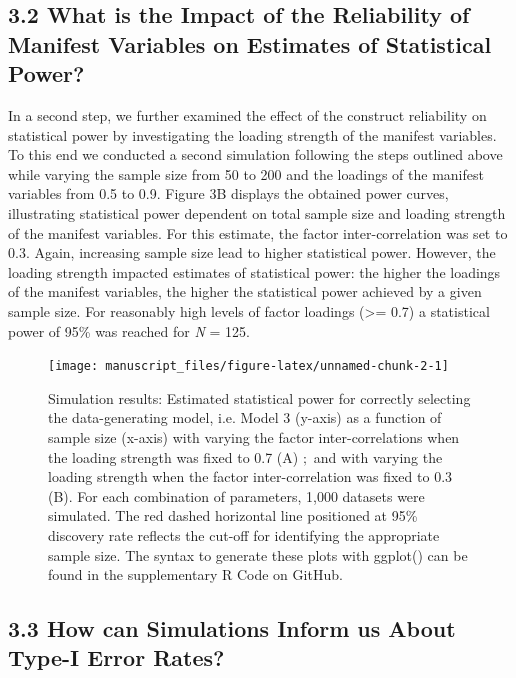 \documentclass[
  man,floatsintext]{apa6}
\begin{document}
\hypertarget{what-is-the-impact-of-the-reliability-of-manifest-variables-on-estimates-of-statistical-power}{%
\subsection{3.2 What is the Impact of the Reliability of Manifest Variables on Estimates of Statistical Power?}\label{what-is-the-impact-of-the-reliability-of-manifest-variables-on-estimates-of-statistical-power}}

In a second step, we further examined the effect of the construct reliability on statistical power by investigating the loading strength of the manifest variables. To this end we conducted a second simulation following the steps outlined above while varying the sample size from 50 to 200 and the loadings of the manifest variables from 0.5 to 0.9. Figure 3B displays the obtained power curves, illustrating statistical power dependent on total sample size and loading strength of the manifest variables. For this estimate, the factor inter-correlation was set to 0.3. Again, increasing sample size lead to higher statistical power. However, the loading strength impacted estimates of statistical power: the higher the loadings of the manifest variables, the higher the statistical power achieved by a given sample size. For reasonably high levels of factor loadings (\textgreater= 0.7) a statistical power of 95\% was reached for \emph{N} = 125.

\begin{figure}

{\centering \texttt{[image: manuscript\_files/figure-latex/unnamed-chunk-2-1]} 

}

\caption{Simulation results: Estimated statistical power for correctly selecting the data-generating model, i.e. Model 3 (y-axis) as a function of sample size (x-axis) with varying the factor inter-correlations when the loading strength was fixed to 0.7 (A) $;$ and with varying the loading strength when the factor inter-correlation was fixed to 0.3 (B). For each combination of parameters, 1,000 datasets were simulated. The red dashed horizontal line positioned at 95\% discovery rate reflects the cut-off for identifying the appropriate sample size. The syntax to generate these plots with ggplot() can be found in the supplementary R Code on GitHub.}\label{fig:unnamed-chunk-2}
\end{figure}

\hypertarget{how-can-simulations-inform-us-about-type-i-error-rates}{%
\subsection{3.3 How can Simulations Inform us About Type-I Error Rates?}\label{how-can-simulations-inform-us-about-type-i-error-rates}}
\end{document}
